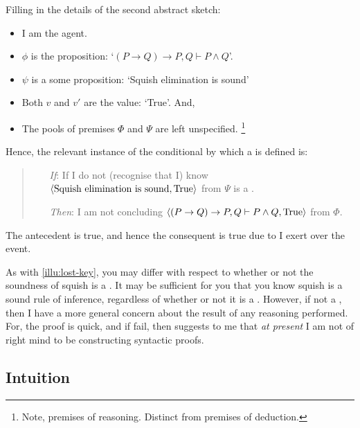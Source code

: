 \begin{note}
  Filling in the details of the second abstract sketch:
  \begin{itemize}[noitemsep]
  \item
    I am the agent.
  \item
    \(\phi\) is the proposition: `\((P \rightarrow Q) \rightarrow P, Q \vdash P \land Q\)'.
  \item
    \(\psi\) is a some proposition: `Squish elimination is sound'
  \item
    Both \(v\) and \(v'\) are the value: `True'.
    And,
  \item
    The pools of premises \(\Phi\) and \(\Psi\) are left unspecified.%
    \footnote{
      Note, premises of reasoning.
      Distinct from premises of deduction.
    }
  \end{itemize}

  Hence, the relevant instance of the conditional by which a \requ{} is defined is:

  \begin{quote}
    \begin{itemize}
    \item[\emph{If}:]
      If I do not (recognise that I) know \(\langle \text{Squish elimination is sound}, \text{True} \rangle\) from \(\Psi\) is a \fc{}.
    \item[\emph{Then}:]
      I am not concluding \(\langle (P \rightarrow Q) \rightarrow P, Q \vdash P \land Q, \text{True} \rangle\) from \(\Phi\).
    \end{itemize}
  \end{quote}

  The antecedent is true, and hence the consequent is true due to \ninf{} I exert over the event.
\end{note}

\begin{note}
  As with \autoref{illu:lost-key}, you may differ with respect to whether or not the soundness of squish is a \requ{}.
  It may be sufficient for you that you know squish is a sound rule of inference, regardless of whether or not it is a \fc{}.
  However, if not a \fc{}, then I have a more general concern about the result of any reasoning performed.
  For, the proof is quick, and if fail, then suggests to me that \emph{at present} I am not of right mind to be constructing syntactic proofs.
\end{note}


\subsection{Intuition}
\label{sec:intuition-1}

